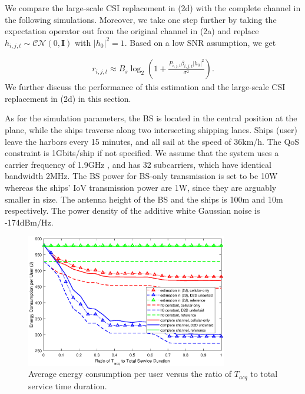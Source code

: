 \documentclass{ieeeaccess}
\begin{document}
We compare the large-scale CSI replacement in (2d) with the complete channel in the following simulations. Moreover, we take one step further by taking the expectation operator out from the original channel in (2a) and replace ${h_{i,j,t}} \sim \mathcal{CN}(0, \mathbf{I})$ with ${\left| {{h_0}} \right|^2} = 1$. Based on a low SNR assumption, we get 

\begin{align}
{r_{i,j,t}} \approx {B_s}{\log _2}\left( {1 + \frac{{{P_{i,j,t}}{\beta _{i,j,t}}{{\left| {{h_0}} \right|}^2}}}{{{\sigma ^2}}}} \right).
\end{align}
We further discuss the performance of this estimation and the large-scale CSI replacement in (2d) in this section.

As for the simulation parameters, the BS is located in the central position at the plane, while the ships traverse along two intersecting shipping lanes.
Ships (user) leave the harbors every 15 minutes, and all sail at the speed of 36km/h. The QoS constraint is 1Gbits/ship if not specified. We assume that the system uses a carrier frequency of 1.9GHz , and has 32 subcarriers, which have identical bandwidth 2MHz. The BS power for BS-only transmission is set to be 10W whereas the ships' IoV transmission power are 1W, since they are arguably smaller in size. The antenna height of the BS and the ships is 100m and 10m respectively. The power density of the additive white Gaussian noise is -174dBm/Hz.


\begin{figure} [htb]
\includegraphics*[width=8.8cm]{Tranges.eps}
\caption{Average energy consumption per user versus the ratio of ${T_{acq}}$ to total service time duration.} \label{fig:4}
\end{figure}
\end{document}
